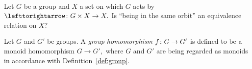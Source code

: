 \documentclass[CT4S-EN-RU]{subfiles}
\begin{document}
\begin{exerciseRUS}~
\end{exerciseRUS}

\begin{exerciseENG}
Let $G$ be a group and $X$ a set on which $G$ acts by $\acts\taking G\times X\to X.$ Is “being in the same orbit” an equivalence relation on $X?$ 
\end{exerciseENG}

\begin{exerciseRUS}
\end{exerciseRUS}

\begin{definitionENG}\label{def:group homomorphism}
Let $G$ and $G'$ be groups. A {\em group homomorphism} $f\colon G\rightarrow G'$ is defined to be a monoid homomorphism $G\to G',$ where $G$ and $G'$ are being regarded as monoids in accordance with Definition~\ref{def:group}.
\end{definitionENG}

\begin{definitionRUS}\label{def:group homomorphism}
\end{definitionRUS}
\end{document}
